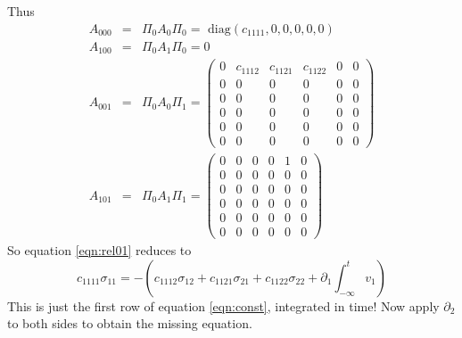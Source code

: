 Thus
\begin{eqnarray}
  A_{000} &=& \Pi_0 A_0 \Pi_0 = \mbox{ diag}(c_{1111},0,0,0,0,0) \nonumber \\
  A_{100} &=& \Pi_0 A_1 \Pi_0 = 0 \nonumber \\
  A_{001} &=& \Pi_0 A_0 \Pi_1 =
              \left(
              \begin{array}{cccccc}
                0 & c_{1112} & c_{1121} & c_{1122} & 0 & 0 \\
                0 & 0 & 0 & 0 & 0 & 0 \\
                0 & 0 & 0 & 0 & 0 & 0 \\                
                0 & 0 & 0 & 0 & 0 & 0 \\
                0 & 0 & 0 & 0 & 0 & 0 \\
                0 & 0 & 0 & 0 & 0 & 0
              \end{array}
                                    \right) \nonumber \\
  A_{101} &=& \Pi_0 A_1 \Pi_1 =
                            \left(
              \begin{array}{cccccc}
                0 & 0 & 0 & 0 & 1 & 0 \\
                0 & 0 & 0 & 0 & 0 & 0 \\
                0 & 0 & 0 & 0 & 0 & 0 \\                
                0 & 0 & 0 & 0 & 0 & 0 \\
                0 & 0 & 0 & 0 & 0 & 0 \\
                0 & 0 & 0 & 0 & 0 & 0
              \end{array}
                                    \right)
                                    \label{eqn:ela0}
\end{eqnarray}
So equation \ref{eqn:rel01} reduces to
\[
  c_{1111}\sigma_{11} = -(c_{1112}\sigma_{12} + c_{1121}\sigma_21 + c_{1122}\sigma_{22} + \partial_1 \int_{-\infty}^t v_1)
\]
This is just the first row of equation \ref{eqn:const}, integrated in time! Now apply $\partial_2$ to both sides to obtain the missing equation.



